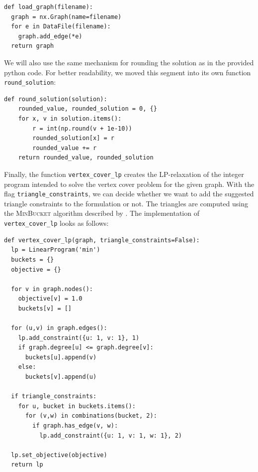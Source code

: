 \documentclass{article}
\begin{document}
\begin{lstlisting}
def load_graph(filename):
  graph = nx.Graph(name=filename)
  for e in DataFile(filename):
    graph.add_edge(*e)
  return graph
\end{lstlisting}

We will also use the same mechanism for rounding the solution as in the provided python code. For better readability, we moved this segment into its own function \lstinline|round_solution|:

\begin{lstlisting}
def round_solution(solution):
    rounded_value, rounded_solution = 0, {}
    for x, v in solution.items():
        r = int(np.round(v + 1e-10))
        rounded_solution[x] = r
        rounded_value += r
    return rounded_value, rounded_solution
\end{lstlisting}

Finally, the function \lstinline|vertex_cover_lp| creates the LP-relaxation of the integer program intended to solve the vertex cover problem for the given graph. With the flag \lstinline|triangle_constraints|, we can decide whether we want to add the suggested triangle constraints to the formulation or not. The triangles are computed using the \textsc{MinBucket} algorithm described by \citet{Berry15}. The implementation of \lstinline|vertex_cover_lp| looks as follows:

\begin{lstlisting}
def vertex_cover_lp(graph, triangle_constraints=False):
  lp = LinearProgram('min')
  buckets = {}
  objective = {}
  
  for v in graph.nodes():
    objective[v] = 1.0
    buckets[v] = []
  
  for (u,v) in graph.edges():
    lp.add_constraint({u: 1, v: 1}, 1)
    if graph.degree[u] <= graph.degree[v]:
      buckets[u].append(v)
    else:
      buckets[v].append(u)
          
  if triangle_constraints:
    for u, bucket in buckets.items():
      for (v,w) in combinations(bucket, 2):
        if graph.has_edge(v, w):
          lp.add_constraint({u: 1, v: 1, w: 1}, 2)
      
  lp.set_objective(objective)
  return lp
\end{lstlisting}
\end{document}
